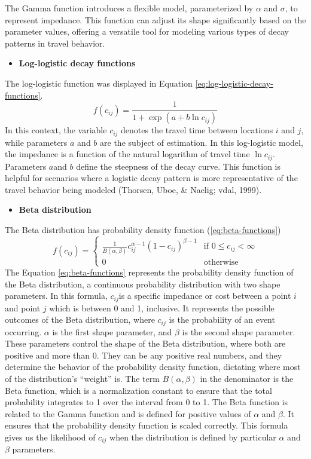 \documentclass[12pt,twoside]{reedthesis}
\providecommand{\tightlist}{%
  \setlength{\itemsep}{0pt}\setlength{\parskip}{0pt}}
\begin{document}
The Gamma function introduces a flexible model, parameterized by \(\alpha\) and \(\sigma\), to represent impedance. This function can adjust its shape significantly based on the parameter values, offering a versatile tool for modeling various types of decay patterns in travel behavior.
\begin{itemize}
\tightlist
\item
  \textbf{Log-logistic decay functions}
\end{itemize}
The log-logistic function was displayed in Equation \eqref{eq:log-logistic-decay-functions}.
\begin{equation}
f(c_{ij}) = \frac {1}{1+ \exp(a + b\ln c_{ij})}
\label{eq:log-logistic-decay-functions}
\end{equation}
In this context, the variable \(c_{ij}\) denotes the travel time between locations \(i\) and \(j\), while parameters \(a\) and \(b\) are the subject of estimation. In this log-logistic model, the impedance is a function of the natural logarithm of travel time \(\ln c_{ij}\). Parameters \(a\)and \(b\) define the steepness of the decay curve. This function is helpful for scenarios where a logistic decay pattern is more representative of the travel behavior being modeled (Thorsen, Uboe, \& Naelig; vdal, 1999).
\begin{itemize}
\tightlist
\item
  \textbf{Beta distribution}
\end{itemize}
The Beta distribution has probability density function (\eqref{eq:beta-functions})
\begin{equation}
f(c_{ij}) = 
\begin{cases}
\frac{1}{B(\alpha, \beta)} c_{ij}^{\alpha - 1}(1 - c_{ij})^{\beta - 1} & \text{if } 0 \leq c_{ij} < \infty \\
0 & \text{otherwise}
\end{cases}
\label{eq:beta-functions}
\end{equation}
The Equation \eqref{eq:beta-functions} represents the probability density function of the Beta distribution, a continuous probability distribution with two shape parameters. In this formula, \(c_{ij}\)is a specific impedance or cost between a point \(i\) and point \(j\) which is between 0 and 1, inclusive. It represents the possible outcomes of the Beta distribution, where \(c_{ij}\) is the probability of an event occurring. \(\alpha\) is the first shape parameter, and \(\beta\) is the second shape parameter. These parameters control the shape of the Beta distribution, where both are positive and more than 0. They can be any positive real numbers, and they determine the behavior of the probability density function, dictating where most of the distribution's ``weight'' is. The term \(B(\alpha, \beta)\) in the denominator is the Beta function, which is a normalization constant to ensure that the total probability integrates to 1 over the interval from 0 to 1. The Beta function is related to the Gamma function and is defined for positive values of \(\alpha\) and \(\beta\). It ensures that the probability density function is scaled correctly. This formula gives us the likelihood of \(c_{ij}\) when the distribution is defined by particular \(\alpha\) and \(\beta\) parameters.
\end{document}
